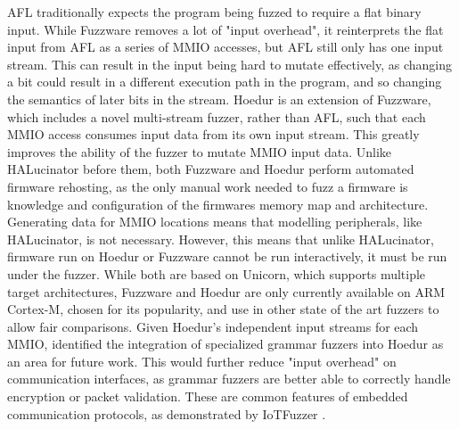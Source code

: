 \documentclass[../report.tex]{subfiles}
\begin{document}
AFL traditionally expects the program being fuzzed to require a flat binary input.
While Fuzzware removes a lot of "input overhead", it reinterprets the flat
input from AFL as a series of MMIO accesses, but AFL still only has one input
stream. This can result in the input being hard to mutate effectively, as
changing a bit could result in a different execution path in the program, and
so changing the semantics of later bits in the stream.
Hoedur \citep{Hoedur_2023} is an extension of Fuzzware, which includes a novel
multi-stream fuzzer, rather than AFL, such that each MMIO access consumes input
data from its own input stream. This greatly improves the ability of the fuzzer
to mutate MMIO input data. Unlike HALucinator before them, both Fuzzware and
Hoedur perform automated firmware rehosting, as the only manual work needed to
fuzz a firmware is knowledge and configuration of the firmwares memory map and
architecture. Generating data for MMIO locations means that modelling
peripherals, like HALucinator, is not necessary. However, this means that
unlike HALucinator, firmware run on Hoedur or Fuzzware cannot be run
interactively, it must be run under the fuzzer. While both are based on
Unicorn, which supports multiple target architectures, Fuzzware and Hoedur are
only currently available on ARM Cortex-M, chosen for its popularity, and use in
other state of the art fuzzers to allow fair comparisons. Given Hoedur's
independent input streams for each MMIO, \citet{Hoedur_2023} identified the
integration of specialized grammar fuzzers into Hoedur as an area for future
work. This would further reduce "input overhead" on communication interfaces,
as grammar fuzzers are better able to correctly handle encryption or packet
validation. These are common features of embedded communication protocols, as
demonstrated by IoTFuzzer \citep{IOTFuzzer_2018}.
\end{document}
